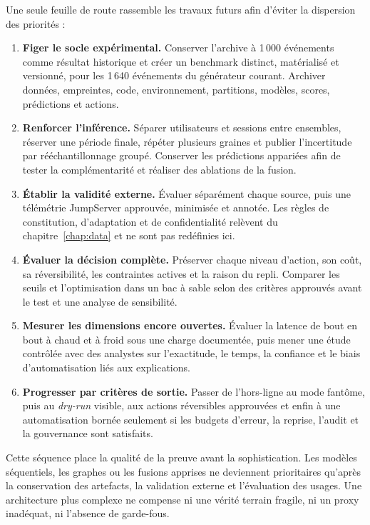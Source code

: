 \documentclass[11pt,a4paper,oneside]{report}
\theoremstyle{definition}
\theoremstyle{plain}
\begin{document}
Une seule feuille de route rassemble les travaux futurs afin d'éviter la
dispersion des priorités :
\begin{enumerate}[leftmargin=*]
  \item \textbf{Figer le socle expérimental.} Conserver l'archive à 1\,000
        événements comme résultat historique et créer un benchmark distinct,
        matérialisé et versionné, pour les 1\,640 événements du générateur
        courant. Archiver données, empreintes, code, environnement, partitions,
        modèles, scores, prédictions et actions.
  \item \textbf{Renforcer l'inférence.} Séparer utilisateurs et sessions entre
        ensembles, réserver une période finale, répéter plusieurs graines et
        publier l'incertitude par rééchantillonnage groupé. Conserver les
        prédictions appariées afin de tester la complémentarité et réaliser des
        ablations de la fusion.
  \item \textbf{Établir la validité externe.} Évaluer séparément chaque source,
        puis une télémétrie JumpServer approuvée, minimisée et annotée. Les
        règles de constitution, d'adaptation et de confidentialité relèvent du
        chapitre~\ref{chap:data} et ne sont pas redéfinies ici.
  \item \textbf{Évaluer la décision complète.} Préserver chaque niveau d'action,
        son coût, sa réversibilité, les contraintes actives et la raison du
        repli. Comparer les seuils et l'optimisation dans un bac à sable selon
        des critères approuvés avant le test et une analyse de sensibilité.
  \item \textbf{Mesurer les dimensions encore ouvertes.} Évaluer la latence de
        bout en bout à chaud et à froid sous une charge documentée, puis mener
        une étude contrôlée avec des analystes sur l'exactitude, le temps, la
        confiance et le biais d'automatisation liés aux explications.
  \item \textbf{Progresser par critères de sortie.} Passer de l'hors-ligne au
        mode fantôme, puis au \emph{dry-run} visible, aux actions réversibles
        approuvées et enfin à une automatisation bornée seulement si les
        budgets d'erreur, la reprise, l'audit et la gouvernance sont satisfaits.
\end{enumerate}

Cette séquence place la qualité de la preuve avant la sophistication. Les
modèles séquentiels, les graphes ou les fusions apprises ne deviennent
prioritaires qu'après la conservation des artefacts, la validation externe et
l'évaluation des usages. Une architecture plus complexe ne compense ni une
vérité terrain fragile, ni un proxy inadéquat, ni l'absence de garde-fous.
\end{document}
